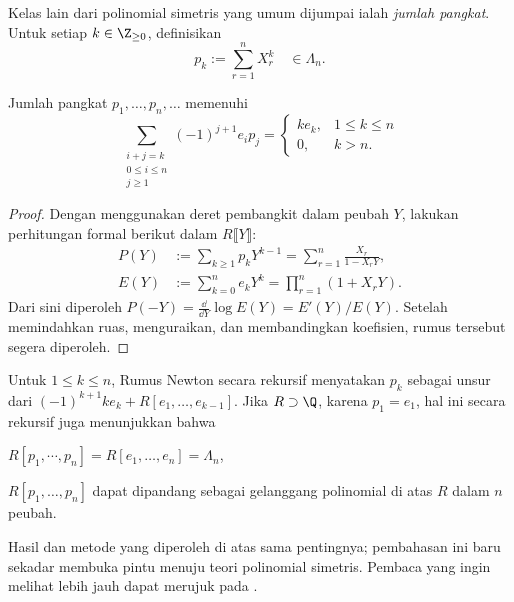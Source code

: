 Kelas lain dari polinomial simetris yang umum dijumpai ialah \emph{jumlah pangkat}. Untuk setiap $k \in \Z_{\geq 0}$, definisikan 
\[ p_k := \sum_{r=1}^n X_r^k \quad \in \Lambda_n. \]

\begin{theorem} 
	Jumlah pangkat $p_1, \ldots, p_n, \ldots$ memenuhi
	\[ \sum_{\substack{i+j=k \\ 0 \leq i \leq n \\ j \geq 1}} (-1)^{j+1} e_i p_j =
	\begin{cases}
		k e_k, & 1 \leq k \leq n \\
		0, & k > n.
	\end{cases}\]
\end{theorem}
\begin{proof}
	Dengan menggunakan deret pembangkit dalam peubah $Y$, lakukan perhitungan formal berikut dalam $R\llbracket Y \rrbracket$:
	\begin{align*}
		P(Y) & := \sum_{k \geq 1} p_k Y^{k-1} = \sum_{r=1}^n \frac{X_r}{1 - X_r Y}, \\
		E(Y) & := \sum_{k=0}^n e_k Y^k = \prod_{r=1}^n (1 + X_r Y).
	\end{align*}
Dari sini diperoleh $P(-Y) = \frac{\dd}{\dd Y} \log E(Y) = E'(Y)/E(Y)$. Setelah memindahkan ruas, menguraikan, dan membandingkan koefisien, rumus tersebut segera diperoleh.
\end{proof}
Untuk $1 \leq k \leq n$, Rumus Newton secara rekursif menyatakan $p_k$ sebagai unsur dari $(-1)^{k+1} k e_k + R[e_1, \ldots, e_{k-1}]$. Jika $R \supset \Q$, karena $p_1 = e_1$, hal ini secara rekursif juga menunjukkan bahwa
\begin{compactitem}
	\item $R[p_1, \cdots, p_n] = R[e_1, \ldots, e_n] = \Lambda_n$,
	\item $R[p_1, \ldots, p_n]$ dapat dipandang sebagai gelanggang polinomial di atas $R$ dalam $n$ peubah.
\end{compactitem}

Hasil dan metode yang diperoleh di atas sama pentingnya; pembahasan ini baru sekadar membuka pintu menuju teori polinomial simetris. Pembaca yang ingin melihat lebih jauh dapat merujuk pada \cite{Mac95}.


